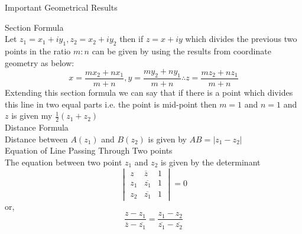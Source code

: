 \documentclass[aspectratio=169,8pt]{beamer}
\begin{document}
\begin{frame}{Important Geometrical Results}

  {\large Section Formula\\}
  \vspace*{0.2cm}
  Let $z_1=x_1+iy_1, z_2=x_2+iy_2$ then if $z=x+iy$ which divides the previous two points in the ratio $m:n$ can be given by using the results from coordinate geometry as below:
  $$x = \frac{mx_2 + nx_1}{m + n}, y = \frac{my_2 + ny_1}{m + n} \therefore z = \frac{mz_2 + nz_1}{m + n}$$
  Extending this section formula we can say that if there is a point which divides this line in two equal parts i.e. the point is mid-point then $m = 1$ and $n = 1$ and $z$ is given my $\frac{1}{2}(z_1 + z_2)$\\\vspace*{0.2cm}
  {\large Distance Formula\\}
  \vspace*{0.2cm}
  Distance between $A(z_1)$ and $B(z_2)$ is given by $AB = |z_1 - z_2|$\\
  \vspace*{0.2cm}
          {\large Equation of Line Passing Through Two points\\}
          \vspace*{0.2cm}
          The equation between two point $z_1$ and $z_2$ is given by the determinant
          $$\begin{vmatrix}z&\overline{z} & 1\\z_1&\overline{z_1} & 1\\z_2&\overline{z_1} & 1\end{vmatrix} = 0$$
            or, $$\frac{z - z_1}{\overline{z} - \overline{z_1}} = \frac{z_1 - z_2}{\overline{z_1} - \overline{z_2}}$$
\end{frame}
\end{document}
